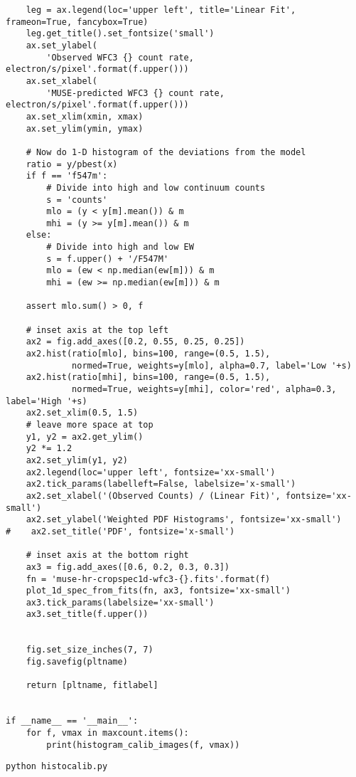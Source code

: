 \documentclass[11pt]{article}
\begin{document}
\begin{verbatim}
    leg = ax.legend(loc='upper left', title='Linear Fit', frameon=True, fancybox=True)
    leg.get_title().set_fontsize('small')
    ax.set_ylabel(
        'Observed WFC3 {} count rate, electron/s/pixel'.format(f.upper()))
    ax.set_xlabel(
        'MUSE-predicted WFC3 {} count rate, electron/s/pixel'.format(f.upper()))
    ax.set_xlim(xmin, xmax)
    ax.set_ylim(ymin, ymax)

    # Now do 1-D histogram of the deviations from the model
    ratio = y/pbest(x)
    if f == 'f547m':
        # Divide into high and low continuum counts
        s = 'counts'
        mlo = (y < y[m].mean()) & m
        mhi = (y >= y[m].mean()) & m
    else:
        # Divide into high and low EW
        s = f.upper() + '/F547M'
        mlo = (ew < np.median(ew[m])) & m
        mhi = (ew >= np.median(ew[m])) & m

    assert mlo.sum() > 0, f

    # inset axis at the top left
    ax2 = fig.add_axes([0.2, 0.55, 0.25, 0.25])
    ax2.hist(ratio[mlo], bins=100, range=(0.5, 1.5),
             normed=True, weights=y[mlo], alpha=0.7, label='Low '+s)
    ax2.hist(ratio[mhi], bins=100, range=(0.5, 1.5),
             normed=True, weights=y[mhi], color='red', alpha=0.3, label='High '+s)
    ax2.set_xlim(0.5, 1.5)
    # leave more space at top
    y1, y2 = ax2.get_ylim()
    y2 *= 1.2
    ax2.set_ylim(y1, y2)
    ax2.legend(loc='upper left', fontsize='xx-small')
    ax2.tick_params(labelleft=False, labelsize='x-small')
    ax2.set_xlabel('(Observed Counts) / (Linear Fit)', fontsize='xx-small')
    ax2.set_ylabel('Weighted PDF Histograms', fontsize='xx-small')
#    ax2.set_title('PDF', fontsize='x-small')

    # inset axis at the bottom right
    ax3 = fig.add_axes([0.6, 0.2, 0.3, 0.3])
    fn = 'muse-hr-cropspec1d-wfc3-{}.fits'.format(f)
    plot_1d_spec_from_fits(fn, ax3, fontsize='xx-small')
    ax3.tick_params(labelsize='xx-small')
    ax3.set_title(f.upper())


    fig.set_size_inches(7, 7)
    fig.savefig(pltname)

    return [pltname, fitlabel]


if __name__ == '__main__':
    for f, vmax in maxcount.items():
        print(histogram_calib_images(f, vmax))
\end{verbatim}


\begin{verbatim}
python histocalib.py
\end{verbatim}
\end{document}
